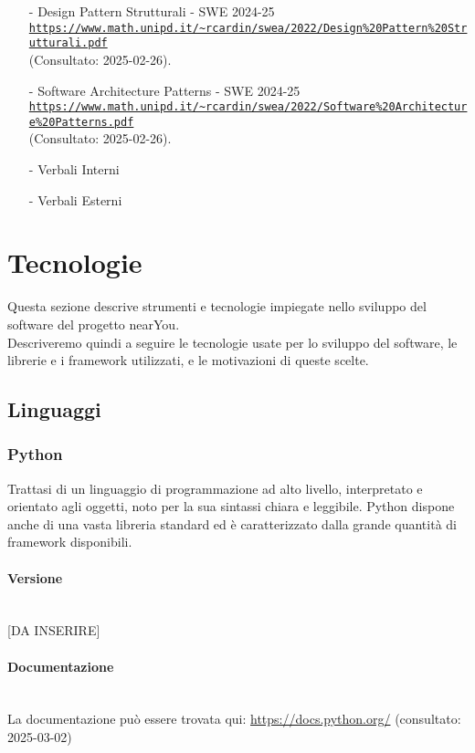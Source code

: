 \documentclass[10pt]{article}
\newcommand{\myparagraph}[1]{\paragraph{#1}\mbox{}\\\vspace{0.4em}}
\begin{document}
\begin{justify}
\begin{itemize}
    \item[-] Design Pattern Strutturali - SWE 2024-25\\
    \textcolor{blue}{\texttt{\url{https://www.math.unipd.it/~rcardin/swea/2022/Design%20Pattern%20Strutturali.pdf}}}\\ (Consultato: 2025-02-26).

    \item[-] Software Architecture Patterns - SWE 2024-25\\
    \textcolor{blue}{\texttt{\url{https://www.math.unipd.it/~rcardin/swea/2022/Software%20Architecture%20Patterns.pdf}}}\\ (Consultato: 2025-02-26).

    \item[-] Verbali Interni
    \item[-] Verbali Esterni
\end{itemize}

\section{Tecnologie}
Questa sezione descrive strumenti e tecnologie impiegate nello sviluppo del software del progetto nearYou.\\
Descriveremo quindi a seguire le tecnologie usate per lo sviluppo del software, le librerie e i framework utilizzati, e le motivazioni di queste scelte.\\

    \subsection{Linguaggi}
        \subsubsection{Python}
            Trattasi di un linguaggio di programmazione ad alto livello, interpretato e orientato agli oggetti, noto per la sua sintassi chiara e leggibile. Python dispone
            anche di una vasta libreria standard ed è caratterizzato dalla grande quantità di framework disponibili.\\
            \myparagraph{Versione}
                [DA INSERIRE]
            \myparagraph{Documentazione}
                     La documentazione può essere trovata qui: \url{https://docs.python.org/} (consultato: 2025-03-02)

\end{justify}
\end{document}
